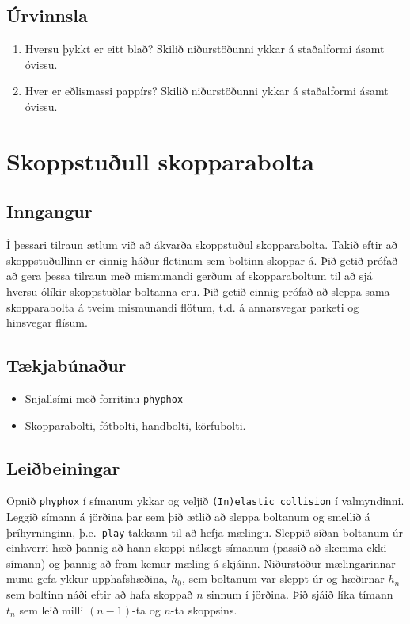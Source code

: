 \documentclass[oneside]{book}
\theoremstyle{definition}
\begin{document}
\subsection*{Úrvinnsla}

\begin{enumerate}[label = (\roman*)]
    \item Hversu þykkt er eitt blað? Skilið niðurstöðunni ykkar á staðalformi ásamt óvissu.
     
    \item Hver er eðlismassi pappírs? Skilið niðurstöðunni ykkar á staðalformi ásamt óvissu.
\end{enumerate}

\newpage

\section{Skoppstuðull skopparabolta}

\subsection*{Inngangur}

Í þessari tilraun ætlum við að ákvarða skoppstuðul skopparabolta. Takið eftir að skoppstuðullinn er einnig háður fletinum sem boltinn skoppar á. Þið getið prófað að gera þessa tilraun með mismunandi gerðum af skopparaboltum til að sjá hversu ólíkir skoppstuðlar boltanna eru. Þið getið einnig prófað að sleppa sama skopparabolta á tveim mismunandi flötum, t.d. á annarsvegar parketi og hinsvegar flísum.

\subsection*{Tækjabúnaður}

\begin{itemize}
    \item Snjallsími með forritinu \verb|phyphox|
    
    \item Skopparabolti, fótbolti, handbolti, körfubolti.
\end{itemize}

\subsection*{Leiðbeiningar}

Opnið \verb|phyphox| í símanum ykkar og veljið \verb|(In)elastic collision| í valmyndinni. Leggið símann á jörðina þar sem þið ætlið að sleppa boltanum og smellið á þríhyrninginn, þ.e.~\verb|play| takkann til að hefja mælingu. Sleppið síðan boltanum úr einhverri hæð þannig að hann skoppi nálægt símanum (passið að skemma ekki símann) og þannig að fram kemur mæling á skjáinn. Niðurstöður mælingarinnar munu gefa ykkur upphafshæðina, $h_0$, sem boltanum var sleppt úr og hæðirnar $h_n$ sem boltinn náði eftir að hafa skoppað $n$ sinnum í jörðina. Þið sjáið líka tímann $t_n$ sem leið milli $(n-1)$-ta og $n$-ta skoppsins.
\end{document}
